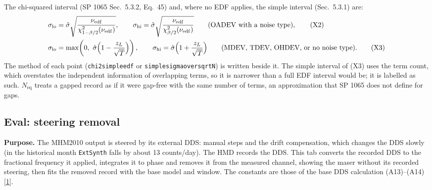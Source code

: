 \documentclass[11pt,a4paper]{article}
\newcommand{\manual}{\href{https://www.gb.nrao.edu/~fghigo/timer/MSMmaser/Maser_UG_75666-201_Rev_J.PDF}{[1]}}
\renewcommand{\_}{\usscore\allowbreak}
\begin{document}
The chi-squared interval (SP 1065 Sec.~5.3.2, Eq.~45) and, where no EDF applies, the simple interval
(Sec.~5.3.1) are:
\begin{align}
\sigma_{\mathrm{lo}}&=\hat\sigma\sqrt{\frac{\nu_{\mathrm{edf}}}{\chi^2_{1-\beta/2}(\nu_{\mathrm{edf}})}},\qquad
\sigma_{\mathrm{hi}}=\hat\sigma\sqrt{\frac{\nu_{\mathrm{edf}}}{\chi^2_{\beta/2}(\nu_{\mathrm{edf}})}}
\qquad(\text{OADEV with a noise type}), \tag{X2}\label{eq:X2}\\
\sigma_{\mathrm{lo}}&=\max\!\left(0,\ \hat\sigma\Bigl(1-\frac{z_L}{\sqrt T}\Bigr)\right),\qquad
\sigma_{\mathrm{hi}}=\hat\sigma\Bigl(1+\frac{z_L}{\sqrt T}\Bigr)
\qquad(\text{MDEV, TDEV, OHDEV, or no noise type}). \tag{X3}\label{eq:X3}
\end{align}
The method of each point (\texttt{chi2\_simple\_edf} or \texttt{simple\_sigma\_over\_sqrtN}) is written
beside it. The simple interval of (X3) uses the term count, which overstates the independent
information of overlapping terms, so it is narrower than a full EDF interval would be; it is labelled
as such. \(N_{\mathrm{eq}}\) treats a gapped record as if it were gap-free with the same number of
terms, an approximation that SP 1065 does not define for gaps.

\subsection{Eval: steering removal}\label{sec:steering}
\textbf{Purpose.} The MHM2010 output is steered by its external DDS: manual steps and the drift
compensation, which changes the DDS slowly (in the historical month \texttt{ExtSynth\_32} falls by about
13 counts/day). The HMD records the DDS. This tab converts the recorded DDS to the fractional frequency
it applied, integrates it to phase and removes it from the measured channel, showing the maser without
its recorded steering, then fits the removed record with the base model and window. The constants are
those of the base DDS calculation (A13)--(A14) \manual.
\end{document}
